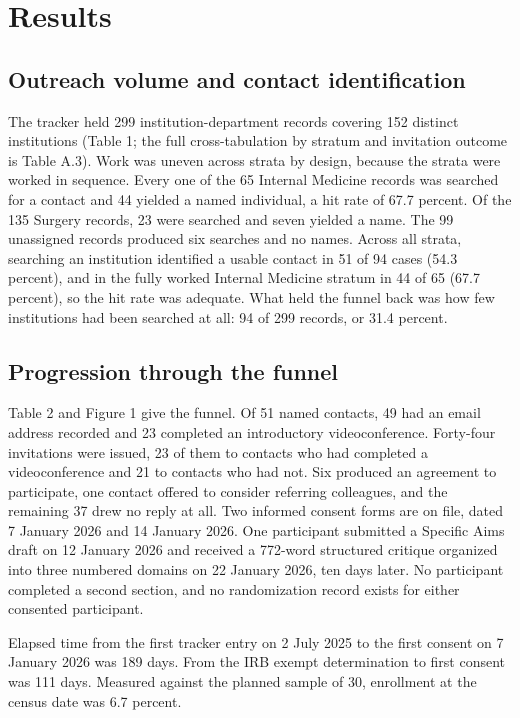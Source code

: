 \documentclass[11pt,a4paper]{article}
\begin{document}
\section{Results}

\subsection{Outreach volume and contact identification}

The tracker held 299 institution-department records covering 152 distinct institutions (Table 1; the full cross-tabulation by stratum and invitation outcome is Table A.3). Work was uneven across strata by design, because the strata were worked in sequence. Every one of the 65 Internal Medicine records was searched for a contact and 44 yielded a named individual, a hit rate of 67.7 percent. Of the 135 Surgery records, 23 were searched and seven yielded a name. The 99 unassigned records produced six searches and no names. Across all strata, searching an institution identified a usable contact in 51 of 94 cases (54.3 percent), and in the fully worked Internal Medicine stratum in 44 of 65 (67.7 percent), so the hit rate was adequate. What held the funnel back was how few institutions had been searched at all: 94 of 299 records, or 31.4 percent.

\subsection{Progression through the funnel}

Table 2 and Figure 1 give the funnel. Of 51 named contacts, 49 had an email address recorded and 23 completed an introductory videoconference. Forty-four invitations were issued, 23 of them to contacts who had completed a videoconference and 21 to contacts who had not. Six produced an agreement to participate, one contact offered to consider referring colleagues, and the remaining 37 drew no reply at all. Two informed consent forms are on file, dated 7 January 2026 and 14 January 2026. One participant submitted a Specific Aims draft on 12 January 2026 and received a 772-word structured critique organized into three numbered domains on 22 January 2026, ten days later. No participant completed a second section, and no randomization record exists for either consented participant.

Elapsed time from the first tracker entry on 2 July 2025 to the first consent on 7 January 2026 was 189 days. From the IRB exempt determination to first consent was 111 days. Measured against the planned sample of 30, enrollment at the census date was 6.7 percent.
\end{document}
